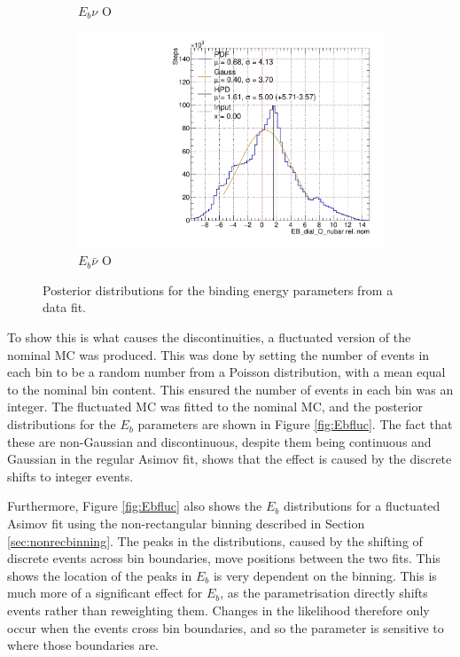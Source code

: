 \begin{figure}[t]
\begin{subfigure}{.48\textwidth}
  \caption{$E_{b}\nu$ O}
\end{subfigure}
\begin{subfigure}{.48\textwidth}
  \centering
  \includegraphics[width=0.73\linewidth]{figs/EB_dial_O_nubarData}
  \caption{$E_{b}\bar{\nu}$ O}
\end{subfigure}
\caption{Posterior distributions for the binding energy parameters from a data fit.}
\label{fig:Ebdata}
\end{figure}

To show this is what causes the discontinuities, a fluctuated version of the nominal MC was produced. This was done by setting the number of events in each bin to be a random number from a Poisson distribution, with a mean equal to the nominal bin content. This ensured the number of events in each bin was an integer. The fluctuated MC was fitted to the nominal MC, and the posterior distributions for the $E_b$ parameters are shown in Figure \ref{fig:Ebfluc}. The fact that these are non-Gaussian and discontinuous, despite them being continuous and Gaussian in the regular Asimov fit, shows that the effect is caused by the discrete shifts to integer events.

Furthermore, Figure \ref{fig:Ebfluc} also shows the $E_b$ distributions for a fluctuated Asimov fit using the non-rectangular binning described in Section \ref{sec:nonrecbinning}. The peaks in the distributions, caused by the shifting of discrete events across bin boundaries, move positions between the two fits. This shows the location of the peaks in $E_{b}$ is very dependent on the binning. This is much more of a significant effect for $E_b$, as the parametrisation directly shifts events rather than reweighting them. Changes in the likelihood therefore only occur when the events cross bin boundaries, and so the parameter is sensitive to where those boundaries are.

